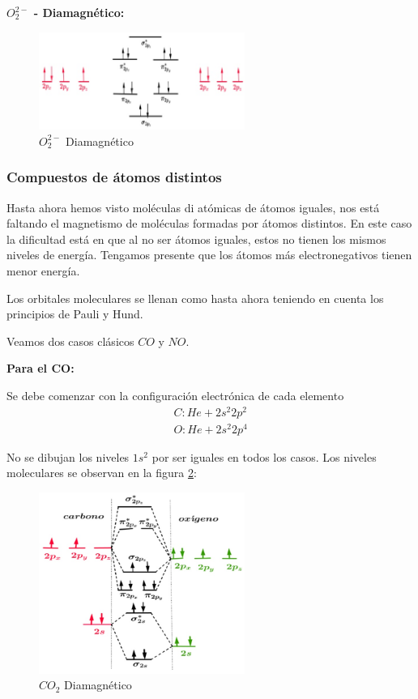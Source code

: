 \textbf{$O_{2}^{2-}$ - Diamagnético:}

\begin{figure}[H]
    \centering
    \includegraphics[width=0.6\textwidth]{./Figures/interaccionCruzadaOxigenoD}
	\caption{$O_{2}^{2-}$ Diamagnético}
	\label{fig:interaccionCruzadaOxigenoD}
\end{figure}

\subsubsection{Compuestos de átomos distintos}

Hasta ahora hemos visto moléculas di atómicas de átomos iguales, nos está faltando el magnetismo de moléculas formadas por átomos distintos. En este caso la dificultad está en que al no ser átomos iguales, estos no tienen los mismos niveles de energía. Tengamos presente que los átomos más electronegativos tienen menor energía.

Los orbitales moleculares se llenan como hasta ahora teniendo en cuenta los principios de Pauli y Hund.

Veamos dos casos clásicos $CO$ y $NO$.

\textbf{Para el CO:}

Se debe comenzar con la configuración electrónica de cada elemento
\begin{equation}
\begin{aligned}
	C: He+ 2s^{2}2p^{2} \\
	O: He+ 2s^{2}2p^{4}
\end{aligned}
\end{equation}

No se dibujan los niveles $1s^{2}$ por ser iguales en todos los casos.
Los niveles moleculares se observan en la figura \ref{fig:CO2Diamagnetico}:

\begin{figure}[H]
    \centering
    \includegraphics[width=0.6\textwidth]{./Figures/CO2Diamagnetico}
	\caption{$CO_{2}$ Diamagnético}
	\label{fig:CO2Diamagnetico}
\end{figure}


